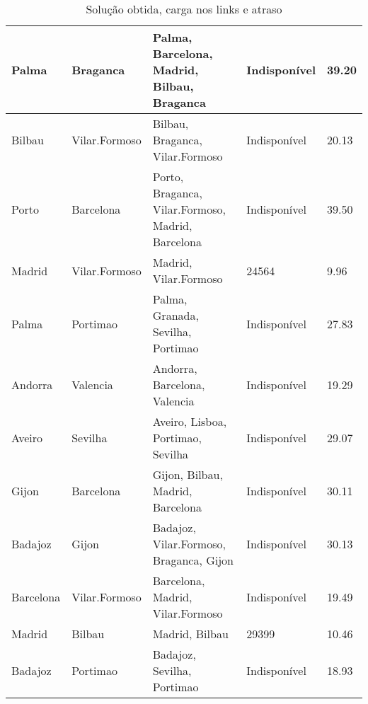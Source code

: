 \begin{table}[!htb]
{\begin{tabular}{|l|l|l|l|l|}
Palma & Braganca & Palma, Barcelona, Madrid, Bilbau, Braganca & Indisponível & 39.20 \\ \hline
Bilbau & Vilar.Formoso & Bilbau, Braganca, Vilar.Formoso & Indisponível & 20.13 \\ \hline
Porto & Barcelona & Porto, Braganca, Vilar.Formoso, Madrid, Barcelona & Indisponível & 39.50 \\ \hline
Madrid & Vilar.Formoso & Madrid, Vilar.Formoso & 24564 & 9.96 \\ \hline
Palma & Portimao & Palma, Granada, Sevilha, Portimao & Indisponível & 27.83 \\ \hline
Andorra & Valencia & Andorra, Barcelona, Valencia & Indisponível & 19.29 \\ \hline
Aveiro & Sevilha & Aveiro, Lisboa, Portimao, Sevilha & Indisponível & 29.07 \\ \hline
Gijon & Barcelona & Gijon, Bilbau, Madrid, Barcelona & Indisponível & 30.11 \\ \hline
Badajoz & Gijon & Badajoz, Vilar.Formoso, Braganca, Gijon & Indisponível & 30.13 \\ \hline
Barcelona & Vilar.Formoso & Barcelona, Madrid, Vilar.Formoso & Indisponível & 19.49 \\ \hline
Madrid & Bilbau & Madrid, Bilbau & 29399 & 10.46 \\ \hline
Badajoz & Portimao & Badajoz, Sevilha, Portimao & Indisponível & 18.93 \\ \hline
\end{tabular}}
\caption[]{Solução obtida, carga nos links e atraso}
\end{table}

